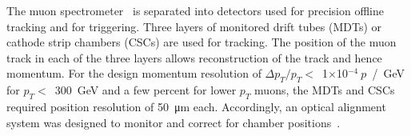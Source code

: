 The muon spectrometer~\cite{atlas_muon_spectrometer_tdr} is separated into detectors used for precision offline tracking and for triggering. Three layers of monitored drift tubes (MDTs) or cathode strip chambers (CSCs) are used for tracking. The position of the muon track in each of the three layers allows reconstruction of the track and hence momentum. For the design momentum resolution of $\Delta p_T / p_T <$~1$\times$10$^{-4}~p$~/~GeV for $p_T <$~300~GeV and a few percent for lower $p_T$ muons, the MDTs and CSCs required position resolution of \SI{50}{\micro\meter} each. Accordingly, an optical alignment system was designed to monitor and correct for chamber positions~\cite{atlas_muon_spectrometer_tdr, aefsky_optical_2008}. 


